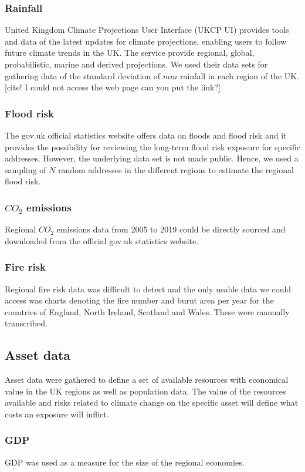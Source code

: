 \documentclass[10pt,a4]{article}
\begin{document}
\subsubsection{Rainfall}
United Kingdom Climate Projections User Interface (UKCP UI) provides tools and data of the latest updates for climate projections, enabling users to follow future climate trends in the UK. The service provide regional, global, probabilistic, marine and derived projections. We used their data sets for gathering data of the standard deviation of $mm$ rainfall in each region of the UK. \cite{}[cite! I could not access the web page can you put the link?]
\subsubsection{Flood risk}
The gov.uk official statistics website offers data on floods and flood risk and it provides the possibility for reviewing the long-term flood risk exposure for specific addresses. However, the underlying data set is not made public. Hence, we used a sampling of $N$ random addresses in the different regions to estimate the regional flood risk. \cite{where}
\subsubsection{$CO_2$ emissions}
Regional $CO_2$ emissions data from 2005 to 2019 could be directly sourced and downloaded from the official gov.uk statistics website. \cite{uk}
\subsubsection{Fire risk}
Regional fire risk data was difficult to detect and the only usable data we could access was charts denoting the fire number and burnt area per year for the countries of England, North Ireland, Scotland and Wales. These were manually transcribed. \cite{countryprofile}
\subsection{Asset data}
Asset data were gathered to define a set of available resources with economical value in the UK regions as well as population data. The value of the resources available and risks related to climate change on the specific asset will define what costs an exposure will inflict. 
\subsubsection{GDP}
GDP was used as a measure for the size of the regional economies.  
\end{document}
